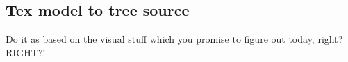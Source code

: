 \newpage
\hypertarget{m2ttex}{}
\subsection{Tex model to tree source}
\texHeader

Do it as based on the visual stuff which you promise to figure out today, right? RIGHT?!